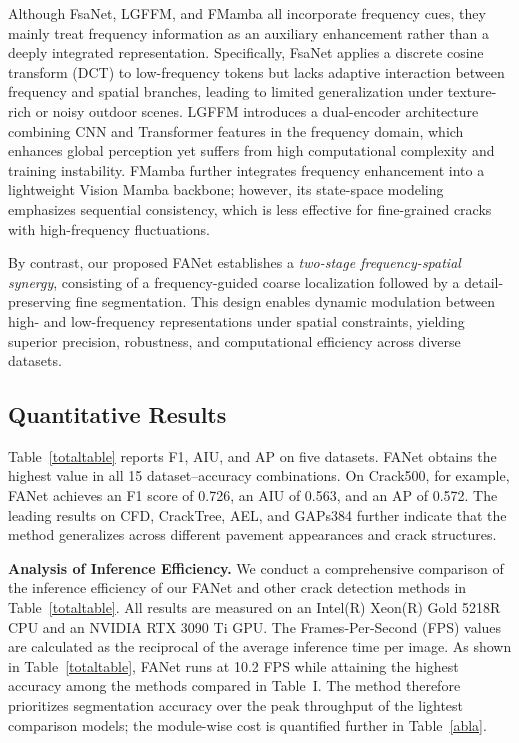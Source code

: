 \documentclass[journal]{IEEEtran}
\begin{document}
Although FsaNet, LGFFM, and FMamba all incorporate frequency cues, they mainly treat frequency information as an auxiliary enhancement rather than a deeply integrated representation. 
Specifically, FsaNet applies a discrete cosine transform (DCT) to low-frequency tokens but lacks adaptive interaction between frequency and spatial branches, leading to limited generalization under texture-rich or noisy outdoor scenes. 
LGFFM introduces a dual-encoder architecture combining CNN and Transformer features in the frequency domain, which enhances global perception yet suffers from high computational complexity and training instability. 
FMamba further integrates frequency enhancement into a lightweight Vision Mamba backbone; however, its state-space modeling emphasizes sequential consistency, which is less effective for fine-grained cracks with high-frequency fluctuations.



By contrast, our proposed FANet establishes a \emph{two-stage frequency-spatial synergy}, consisting of a frequency-guided coarse localization followed by a detail-preserving fine segmentation. 
This design enables dynamic modulation between high- and low-frequency representations under spatial constraints, yielding superior precision, robustness, and computational efficiency across diverse datasets.



%
%



\subsection{Quantitative Results}

Table~\ref{totaltable} reports F1, AIU, and AP on five datasets. FANet obtains the highest value in all 15 dataset--accuracy combinations. On Crack500, for example, FANet achieves an F1 score of 0.726, an AIU of 0.563, and an AP of 0.572. The leading results on CFD, CrackTree, AEL, and GAPs384 further indicate that the method generalizes across different pavement appearances and crack structures.






\textbf{Analysis of Inference Efficiency.}  
We conduct a comprehensive comparison of the inference efficiency of our FANet and other crack detection methods in Table~\ref{totaltable}.  
All results are measured on an Intel(R) Xeon(R) Gold 5218R CPU and an NVIDIA RTX 3090 Ti GPU.  
The Frames-Per-Second (FPS) values are calculated as the reciprocal of the average inference time per image.  
As shown in Table~\ref{totaltable}, FANet runs at 10.2 FPS while attaining the highest accuracy among the methods compared in Table~I. The method therefore prioritizes segmentation accuracy over the peak throughput of the lightest comparison models; the module-wise cost is quantified further in Table~\ref{abla}.
\end{document}
